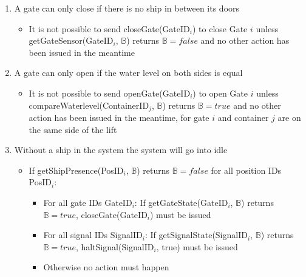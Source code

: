\begin{enumerate}
	\item A gate can only close if there is no ship in between its doors
	\begin{itemize}
		\item It is not possible to send closeGate(GateID$_i$) to close Gate $i$ unless getGateSensor(GateID$_i$, $\mathbb{B}$) returns $\mathbb{B} = false$ and no other action has been issued in the meantime
	\end{itemize}
	
	\item A gate can only open if the water level on both sides is equal
	\begin{itemize}
		\item It is not possible to send openGate(GateID$_i$) to open Gate $i$ unless compareWaterlevel(ContainerID$_j$, $\mathbb{B}$) returns $\mathbb{B} = true$ and no other action has been issued in the meantime, for gate $i$ and container $j$ are on the same side of the lift
	\end{itemize}
	
	\item Without a ship in the system the system will go into idle
	\begin{itemize}
		\item If getShipPresence(PosID$_i$, $\mathbb{B}$) returns $\mathbb{B} = false$ for all position IDs PosID$_i$:
			\begin{itemize}
				\item For all gate IDs GateID$_i$: If getGateState(GateID$_i$, $\mathbb{B}$) returns $\mathbb{B} = true$, closeGate(GateID$_i$) must be issued
				\item For all signal IDs SignalID$_i$: If getSignalState(SignalID$_i$, $\mathbb{B}$) returns $\mathbb{B} = true$, haltSignal(SignalID$_i$, true) must be issued
				\item Otherwise no action must happen
			\end{itemize}
	\end{itemize}
	

\end{enumerate}
